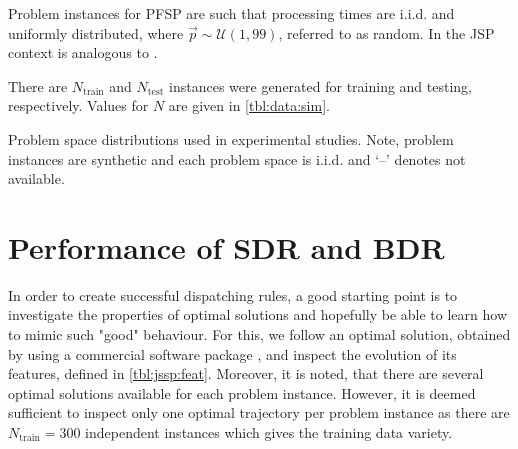 \documentclass[smallextended]{svjour3}
\begin{document}
	Problem instances for PFSP are such that processing times are i.i.d. and uniformly distributed, 
	  where $\vec{p}\sim\mathcal{U}(1,99)$, referred to as random. In the JSP context   is analogous to .
	
	There are $N_{\text{train}}$  and $N_{\text{test}}$ instances were generated for training and testing, respectively. Values for $N$ are given in \cref{tbl:data:sim}. 
	
	\begin{table}\centering
	\caption[Problem space distributions used in experimental studies.]{Problem space distributions used in experimental studies. Note, problem instances are synthetic and each problem space is i.i.d. and `--' denotes not available.}\label{tbl:data:sim}
	
	\end{table}
	
	
	
	
	\section{Performance of SDR and BDR}\label{sec:opt}
	In order to create successful dispatching rules, a good starting point is to investigate the properties of optimal solutions and hopefully be able to learn how to mimic such "good" behaviour. For this, we follow an optimal solution, obtained by using a commercial software package \cite{gurobi}, and inspect the evolution of its features, defined in \cref{tbl:jssp:feat}. Moreover, it is noted, that there are several optimal solutions available for each problem instance. However, it is deemed sufficient to inspect only one optimal trajectory per problem instance as there are $N_{\text{train}}=300$ independent instances which gives the training data variety. 
	
	
\end{document}

